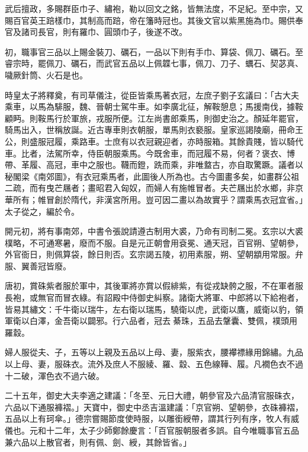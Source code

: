 \begin{pinyinscope}
 武后擅政，多賜群臣巾子、繡袍，勒以回文之銘，皆無法度，不足紀。至中宗，又賜百官英王踣樣巾，其制高而踣，帝在籓時冠也。其後文官以紫黑施為巾。賜供奉官及諸司長官，則有羅巾、圓頭巾子，後遂不改。



 初，職事官三品以上賜金裝刀、礪石，一品以下則有手巾、算袋、佩刀、礪石。至睿宗時，罷佩刀、礪石，而武官五品以上佩韘七事，佩刀、刀子、蠣石、契苾真、噦厥針筒、火石是也。



 時皇太子將釋奠，有司草儀注，從臣皆乘馬著衣冠，左庶子劉子玄議曰：「古大夫乘車，以馬為騑服，魏、晉朝士駕牛車。如李廣北征，解鞍憩息；馬援南伐，據鞍顧眄。則鞍馬行於軍旅，戎服所便。江左尚書郎乘馬，則御史治之。顏延年罷官，騎馬出入，世稱放誕。近古專車則衣朝服，單馬則衣褻服。皇家巡謁陵廟，冊命王公，則盛服冠履，乘路車。士庶有以衣冠親迎者，亦時服箱。其餘貴賤，皆以騎代車。比者，法駕所幸，侍臣朝服乘馬。今既舍車，而冠履不易，何者？褒衣、博帶、革履、高冠，車中之服也。韈而鐙，跣而乘，非唯盩古，亦自取驚蹶。議者以秘閣梁《南郊圖》，有衣冠乘馬者，此圖後人所為也。古今圖畫多矣，如畫群公祖二疏，而有曳芒屩者；畫昭君入匈奴，而婦人有施帷冒者。夫芒屩出於水鄉，非京華所有；帷冒創於隋代，非漢宮所用。豈可因二畫以為故實乎？謂乘馬衣冠宜省。」太子從之，編於令。



 開元初，將有事南郊，中書令張說請遵古制用大裘，乃命有司制二冕。玄宗以大裘樸略，不可通寒暑，廢而不服。自是元正朝會用袞冕、通天冠，百官朔、望朝參，外官衙日，則佩算袋，餘日則否。玄宗謁五陵，初用素服，朔、望朝顓用常服。弁服、翼善冠皆廢。



 唐初，賞硃紫者服於軍中，其後軍將亦賞以假緋紫，有從戎缺骻之服，不在軍者服長袍，或無官而冒衣綠。有詔殿中侍御史糾察。諸衛大將軍、中郎將以下給袍者，皆易其繡文：千牛衛以瑞牛，左右衛以瑞馬，驍衛以虎，武衛以鷹，威衛以豹，領軍衛以白澤，金吾衛以闢邪。行六品者，冠去綦珠，五品去鞶囊、雙佩，襆頭用羅縠。



 婦人服從夫、子，五等以上親及五品以上母、妻，服紫衣，腰襻褾緣用錦繡。九品以上母、妻，服硃衣。流外及庶人不服綾、羅、縠、五色線鞾、履。凡襉色衣不過十二破，渾色衣不過六破。



 二十五年，御史大夫李適之建議：「冬至、元日大禮，朝參官及六品清官服硃衣，六品以下通服褲褶。」天寶中，御史中丞吉溫建議：「京官朔、望朝參，衣硃褲褶，五品以上有珂傘。」德宗嘗賜節度使時服，以雕銜綬帶，謂其行列有序，牧人有威儀也。元和十二年，太子少師鄭餘慶言：「百官服朝服者多誤。自今唯職事官五品兼六品以上散官者，則有佩、劍、綬，其餘皆省。」




\end{pinyinscope}
